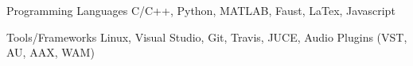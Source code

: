 

\begin{cvskills}

    \cvskill
    {Programming Languages} %
    {C/C++, Python, MATLAB, Faust, LaTex, Javascript} %


    \cvskill
    {Tools/Frameworks} %
    {Linux, Visual Studio, Git, Travis, JUCE, Audio Plugins (VST, AU, AAX, WAM)} %

\end{cvskills}
